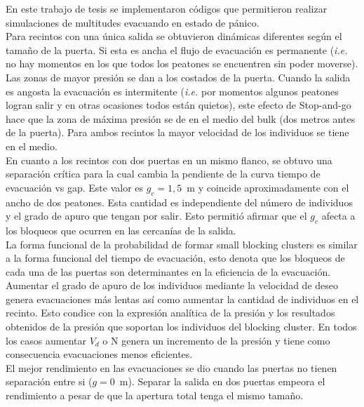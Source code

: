 En este trabajo de tesis se implementaron códigos que permitieron realizar simulaciones de multitudes evacuando en estado de pánico. \\

Para recintos con una única salida se obtuvieron dinámicas diferentes según el tamaño de la puerta. Si esta es ancha el flujo de evacuación es permanente (\emph{i.e.} no hay momentos en los que todos los peatones se encuentren sin poder moverse). Las zonas de mayor presión se dan a los costados de la puerta. Cuando la salida es angosta la evacuación es intermitente (\emph{i.e.} por momentos algunos peatones logran salir y en otras ocasiones todos están quietos), este efecto de Stop-and-go hace que la zona de máxima presión se de en el medio del bulk (dos metros antes de la puerta). 
Para ambos recintos la mayor velocidad de los individuos se tiene en el medio. \\

En cuanto a los recintos con dos puertas en un mismo flanco, se obtuvo  una separación crítica para la cual cambia la pendiente de la curva tiempo de evacuación vs gap. Este valor es $g_c=1,5$~m y coincide aproximadamente con el ancho de dos peatones. Esta cantidad es independiente del número de individuos y el grado de apuro que tengan por salir. Esto permitió afirmar que el $g_c$ afecta a los bloqueos que ocurren en las cercanías de la salida. \\

La forma funcional de la probabilidad de formar small blocking clusters es similar a la forma funcional del tiempo de evacuación, esto denota que los bloqueos de cada una de las puertas son determinantes en la eficiencia de la evacuación. \\

Aumentar el grado de apuro de los individuos mediante la velocidad de deseo genera evacuaciones más lentas así como aumentar la cantidad de individuos en el recinto. Esto condice con la expresión analítica de la presión y los resultados obtenidos de la presión que soportan los individuos del blocking cluster. En todos los casos aumentar $V_d$ o N genera un incremento de la presión y tiene como consecuencia evacuaciones menos eficientes.\\

El mejor rendimiento en las evacuaciones se dio cuando las puertas no tienen separación entre si ($g=0$~m). Separar la salida en dos puertas empeora el rendimiento a pesar de que la apertura total tenga el mismo tamaño.   
